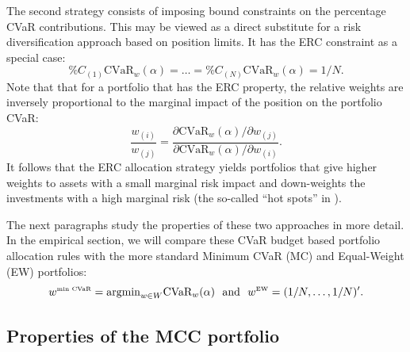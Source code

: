 \documentclass[12pt,a4paper]{article}
\newcommand{\argmin}{{\operatorname{argmin}}}
\begin{document}
The second strategy consists of imposing bound constraints on the percentage CVaR contributions. This may be viewed as a direct substitute for a risk diversification approach based on position limits. It has the ERC constraint as a special case:
\begin{equation}   \%C_{(1)}\mbox{CVaR}_w(\alpha)  = \ldots =  \%C_{(N)}\mbox{CVaR}_w(\alpha) = 1/N. \label{eq:ERCconstraint}\end{equation}
Note that that for a portfolio that has the ERC property, the relative weights are inversely proportional to the marginal impact of the position on the portfolio CVaR:
\begin{equation}   \frac{w_{(i)}}{w_{(j)}} = \frac{ \partial \mbox{CVaR}_w(\alpha)/\partial w_{(j)}}{ \partial \mbox{CVaR}_w(\alpha)/\partial w_{(i)}} . \label{eq:ERCconstraint}\end{equation} It follows that the ERC allocation strategy yields portfolios that give higher weights to assets with a small marginal risk impact and down-weights the investments with a high marginal risk (the so-called ``hot spots'' in \citealt{Litterman1996}).

The next paragraphs study the properties of these two approaches in more detail. In the empirical section, we will compare these CVaR budget based portfolio allocation rules with the more standard Minimum CVaR (MC) and Equal-Weight (EW) portfolios:
\begin{equation}   w^{\mbox{\tiny min CVaR}} = \argmin_{w \in W} \mbox{CVaR}_w(\alpha) \ \ \mbox{and} \ \ w^{\mbox{\tiny EW}} = (1/N,\ldots,1/N)'. \label{eq:benchmarkportfolios}\end{equation} 

\subsection{Properties of the MCC portfolio}
\end{document}
